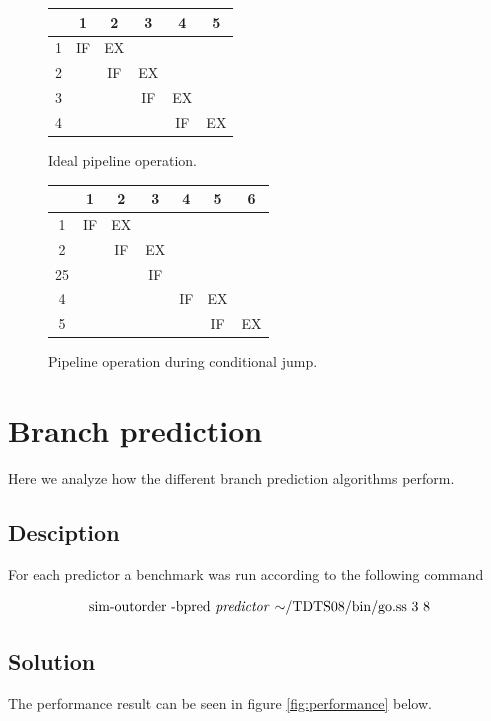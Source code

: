 \documentclass[titlepage, a4paper]{article}
\begin{document}
\begin{figure}[H]
  \centering
  \begin{tabular}{|c|c|c|c|c|c|}
    \hline
        {} & {1} & {2} & {3} & {4} & {5} \\ \hline
        {1} & {IF} & {EX} & {} & {} & {} \\ \hline
        {2} & {} & {IF} & {EX} & {} & {} \\ \hline
        {3} & {} & {} & {IF} & {EX} & {} \\ \hline
        {4} & {} & {} & {} & {IF} & {EX} \\ \hline
  \end{tabular}
  \caption{Ideal pipeline operation.}
  \label{fig:ideal_pipe_op}
\end{figure}

\begin{figure}[H]
  \centering
  \begin{tabular}{|c|c|c|c|c|c|c|}
    \hline
        {} & {1} & {2} & {3} & {4} & {5} & {6} \\ \hline
        {1} & {IF} & {EX} & {} & {} & {} & {} \\ \hline
        {2} & {} & {IF} & {EX} & {} & {} & {} \\ \hline
        {25} & {} & {} & {IF} & {} & {} & {} \\ \hline
        {4} & {} & {} & {} & {IF} & {EX} & {} \\ \hline
        {5} & {} & {} & {} & {} & {IF} & {EX} \\ \hline
  \end{tabular}
  \caption{Pipeline operation during conditional jump.}
  \label{fig:condjmp_pipe_op}
\end{figure}

\section{Branch prediction}
Here we analyze how the different branch prediction algorithms perform.

\subsection{Desciption}
For each predictor a benchmark was run according to the following command

$$\text{sim-outorder -bpred \textit{predictor} $\mathtt{\sim}$/TDTS08/bin/go.ss 3 8}$$


\subsection{Solution}
The performance result can be seen in figure \ref{fig:performance} below.
\end{document}

